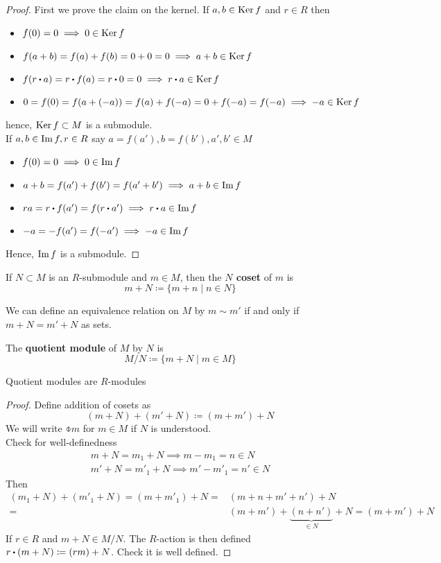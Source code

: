 \documentclass[../Main.tex]{subfiles}
\begin{document}
\begin{proof}
	First we prove the claim on the kernel. If $a,b \in \operatorname{Ker} f$ and $r\in R$ then
	\begin{itemize}
	\item $f(0)=0\implies 0 \in \operatorname{Ker} f$
	\item $f(a+b) = f(a)+f(b) = 0 +0=0 \implies a+b \in \operatorname{Ker} f$
	\item$f(r\rdot a) = r\rdot f(a) = r\rdot 0=0 \implies r\rdot a \in \Ker f$
	\item$0=f(0)=f(a+(-a)) = f(a) + f(-a) = 0 +f(-a) = f(-a) \implies -a\in \operatorname{Ker} f$
	\end{itemize}
	hence, $\operatorname{Ker} f \subset M$ is a submodule.\\
	If $a,b\in \operatorname{Im} f, r\in R$ say $a=f(a'), b=f(b'), a',b' \in M$
	\begin{itemize}
		\item $f(0)=0\implies 0\in \operatorname{Im} f$
		\item $a+b=f(a')+f(b')=f(a'+b')\implies a+b\in \operatorname{Im} f$
		\item $ra=r\rdot f(a')=f(r\rdot a') \implies r\rdot a \in \Img f$
		\item $-a=-f(a')=f(-a') \implies -a\in \operatorname{Im} f$
	\end{itemize}
	Hence, $\operatorname{Im} f$ is a submodule.
\end{proof}
\begin{dfn}[title = coset]
	If $N\subset M$ is an $R$-submodule and $m\in M$, then the \textbf{$N$ coset} of $m$ is
	\[m+N \coloneqq \{m+n\mid n\in N\}\]
\end{dfn}
\Exr We can define an equivalence relation on $M$ by $m\sim m'$ if and only if $m+N = m'+N$ as sets.
\begin{dfn}[title = Quotient Module]
	The \textbf{quotient module} of $M$ by $N$ is
	\[M/N \coloneqq \{m+N \mid m\in M\}\]
\end{dfn}
\begin{prop}[title =Quotient Module is \texorpdfstring{$R$}{R}-module]
	Quotient modules are $R$-modules
\end{prop}
\begin{proof}
	Define addition of cosets as 
	\[(m+N) + (m'+N) \coloneqq (m+m')+N\]
	We will write $\obar{m}$ for $m\in M$ if $N$ is understood.\\
	\Exr Check for well-definedness
	\begin{align*}
	m+N = m_1 + N \implies m-m_1=n \in N\\
	m'+N = m'_1 +N \implies m'-m'_1 = n' \in N
	\end{align*}
	Then
	\begin{align*}(m_1+N)+(m'_1+N) = (m+m'_1)+N =& (m+n+m'+n')+N\\ =& (m+m')+\underbrace{(n+n')}_{\in N} + N =(m+m')+N\end{align*}
	If $r\in R$ and $m+N \in M/N$. The $R$-action is then defined $r\rdot (m+N) \coloneqq (rm)+N$. \Exr Check it is well defined.
\end{proof}
\end{document}
